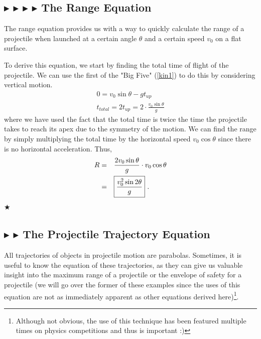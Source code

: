 %
%
\subsection{\color{OrangeRed} $\blacktriangleright$ \color{PineGreen} $\blacktriangleright$ \color{Goldenrod} $\blacktriangleright$ \color{Orchid} $\blacktriangleright$ \color{black} The Range Equation}\label{1.1.2}

\noindent The range equation provides us with a way to quickly calculate the range of a projectile when launched at a certain angle $\theta$ and a certain speed $v_0$ on a flat surface.

\noindent To derive this equation, we start by finding the total time of flight of the projectile. We can use the first of the "Big Five" (\ref{kin1}) to do this by considering vertical motion.
\begin{gather}
0 = v_0 \sin \theta - gt_{up} \\
t_{total} = 2t_{up} = 2\cdot \frac{v_0 \sin{\theta}}{g}
\end{gather}
\noindent where we have used the fact that the total time is twice the time the projectile takes to reach its apex due to the symmetry of the motion. We can find the range by simply multiplying the total time by the horizontal speed $v_0 \cos \theta$ since there is no horizontal acceleration. Thus,
\begin{align}
    R =&\quad \frac{2v_0 \sin{\theta}}{g} \cdot v_0 \cos \theta \nonumber \\
    =&\quad \boxed{\frac{v_0^2 \sin{2\theta}}{g}} \text{ .}
\end{align}
$\bigstar$


%
%
\subsection{\color{Goldenrod} $\blacktriangleright$ \color{Orchid} $\blacktriangleright$ \color{black} The Projectile Trajectory Equation}\label{1.1.3}
\noindent All trajectories of objects in projectile motion are parabolas. Sometimes, it is useful to know the equation of these trajectories, as they can give us valuable insight into the maximum range of a projectile or the envelope of safety for a projectile (we will go over the former of these examples since the uses of this equation are not as immediately apparent as other equations derived here)\footnote{Although not obvious, the use of this technique has been featured multiple times on physics competitions and thus is important :)}.

